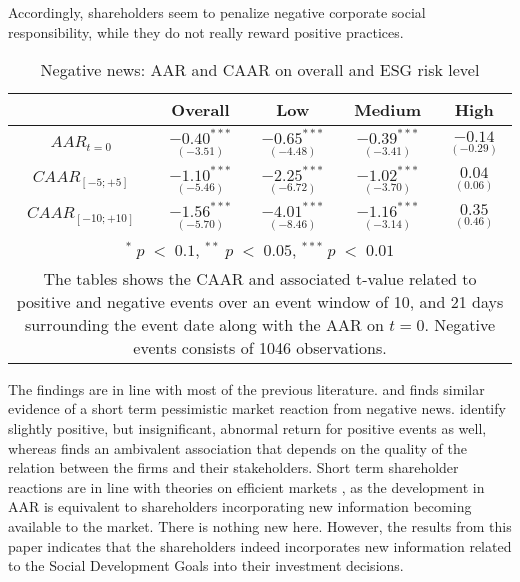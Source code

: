 Accordingly, shareholders seem to penalize negative corporate social responsibility, while they do not really reward positive practices. 

\begin{table}[H]
\centering
\caption{Negative news: AAR and CAAR on overall and ESG risk level} 
\begin{tabular}{ccccc}
  \hline  \hline
  & \multicolumn{1}{c}{Overall} &  \multicolumn{1}{c}{Low} & \multicolumn{1}{c}{Medium} & \multicolumn{1}{c}{High}\\  
 \hline
$AAR_{t=0}$ &   $\underset{(-3.51)}{-0.40^{***}}$ &   $\underset{(-4.48)}{-0.65^{***}}$ &   $\underset{(-3.41)}{-0.39^{***}}$ &   $\underset{(-0.29)}{-0.14 }$ \\

$CAAR_{[-5;+5]}$  &  $\underset{(-5.46)}{-1.10^{***}}$ &   $\underset{(-6.72)}{-2.25^{***}}$ &   $\underset{(-3.70)}{-1.02^{***}}$ &   $\underset{(0.06)}{0.04}$ \\ 

$CAAR_{[-10;+10]}$    & $\underset{(-5.70)}{-1.56^{***}}$ &   $\underset{(-8.46)}{-4.01^{***}}$ &   $\underset{(-3.14)}{-1.16^{***}}$ &   $\underset{(0.46)}{0.35}$ \\ 
   \hline \hline
   \multicolumn{5}{p{12cm}}{ \footnotesize $^* \; p\; <\; 0.1$, $ ^{**} \; p\; <\; 0.05$, $ ^{***} \; p\; <\; 0.01$  } \\
   \multicolumn{5}{p{13cm}}{\footnotesize The tables shows the CAAR and associated t-value related to positive and negative events over an event window of 10, and 21 days surrounding the event date along with the AAR on $t=0$. Negative events consists of 1046 observations. } \\
   \hline
\end{tabular}
\label{tab: ST_neg_significance}
\end{table}

The findings are in line with most of the previous literature. \cite{Blancard_ESG_sentiment} and \citep{kruger2015corporate} finds similar evidence of a short term pessimistic market reaction from negative news. \citeauthor{Blancard_ESG_sentiment} identify slightly positive, but insignificant, abnormal return for positive events as well, whereas \citeauthor{kruger2015corporate} finds an ambivalent association that depends on the quality of the relation between the firms and their stakeholders. Short term shareholder reactions are in line with theories on efficient markets \citep{fama1969_EMH}, as the development in AAR is equivalent to shareholders incorporating new information becoming available to the market. There is nothing new here. However, the results from this paper indicates that the shareholders indeed incorporates new information related to the Social Development Goals into their investment decisions. 

